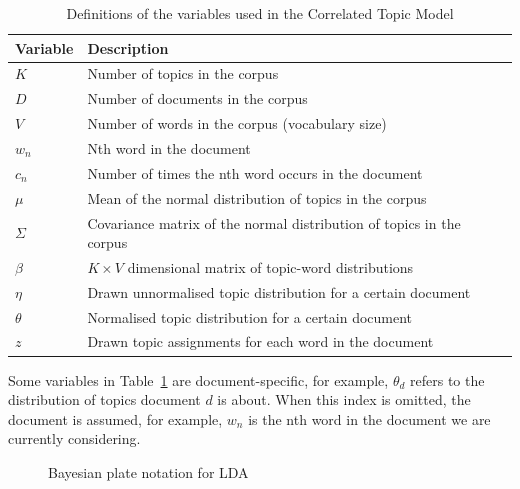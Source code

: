 \documentclass[12pt,a4paper,twoside,openright]{report}
\begin{document}
\begin{table}
\begin{tabular}{| l | l |}
\hline
Variable & Description \\
\hline
$K$ & Number of topics in the corpus \\
$D$ & Number of documents in the corpus \\
$V$ & Number of words in the corpus (vocabulary size) \\
$w_n$ & Nth word in the document \\
$c_n$ & Number of times the nth word occurs in the document \\
$\mu$ & Mean of the normal distribution of topics in the corpus \\
$\Sigma$ & Covariance matrix of the normal distribution of topics in the corpus \\
$\beta$ & $K \times V$ dimensional matrix of topic-word distributions \\
$\eta$ & Drawn unnormalised topic distribution for a certain document \\
$\theta$ & Normalised topic distribution for a certain document \\
$z$ & Drawn topic assignments for each word in the document \\
\hline
\end{tabular}
\caption{Definitions of the variables used in the Correlated Topic Model}
\label{tab:ctm-variables}
\end{table}

Some variables in Table~\ref{tab:ctm-variables} are document-specific, for example, $\theta_d$ refers to the distribution of topics document $d$ is about. When this index is omitted, the document is assumed, for example, $w_n$ is the nth word in the document we are currently considering.

\begin{figure}
\caption{Bayesian plate notation for LDA}
\label{fig:plate-lda}
\end{figure}
\end{document}
